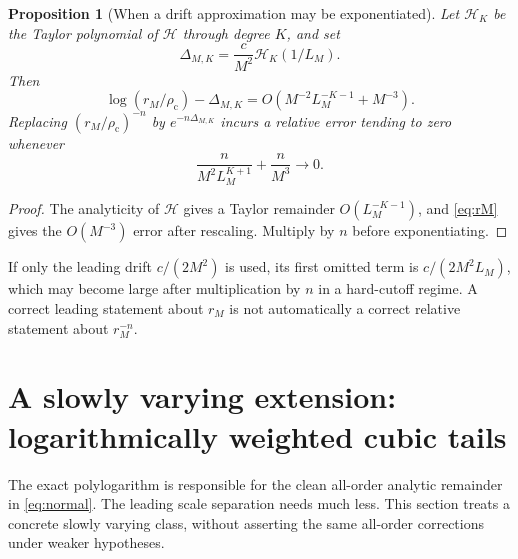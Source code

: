 \documentclass[11pt,a4paper]{article}
\numberwithin{equation}{section}
\newtheorem{proposition}[theorem]{Proposition}
\theoremstyle{definition}
\theoremstyle{remark}
\newcommand{\rhoc}{\rho_{\mathrm c}}
\begin{document}
\begin{proposition}[When a drift approximation may be exponentiated]
\label{prop:exponentiation}
Let $\mathcal H_K$ be the Taylor polynomial of $\mathcal H$ through
degree $K$, and set
\[
 \Delta_{M,K}=\frac{c}{M^2}\mathcal H_K(1/L_M).
\]
Then
\begin{equation}\label{eq:drifterror}
 \log(r_M/\rhoc)-\Delta_{M,K}
 =O\left(M^{-2}L_M^{-K-1}+M^{-3}\right).
\end{equation}
Replacing $(r_M/\rhoc)^{-n}$ by $e^{-n\Delta_{M,K}}$ incurs a
relative error tending to zero whenever
\begin{equation}\label{eq:expcondition}
 \frac{n}{M^2L_M^{K+1}}+\frac{n}{M^3}\longrightarrow0.
\end{equation}
\end{proposition}
\begin{proof}
The analyticity of $\mathcal H$ gives a Taylor remainder
$O(L_M^{-K-1})$, and \eqref{eq:rM} gives the $O(M^{-3})$ error
after rescaling. Multiply by $n$ before exponentiating.
\end{proof}
If only the leading drift $c/(2M^2)$ is used, its first omitted term is
$c/(2M^2L_M)$, which may become large after multiplication by $n$ in a
hard-cutoff regime. A correct leading statement about $r_M$ is not
automatically a correct relative statement about $r_M^{-n}$.

\section{A slowly varying extension: logarithmically weighted cubic tails}
\label{sec:weighted}

The exact polylogarithm is responsible for the clean all-order analytic
remainder in \eqref{eq:normal}. The leading scale separation needs much
less. This section treats a concrete slowly varying class, without
asserting the same all-order corrections under weaker hypotheses.
\end{document}
